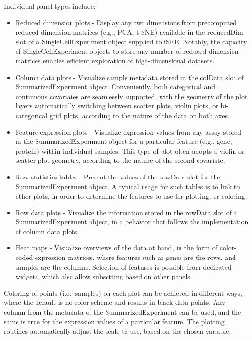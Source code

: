 \documentclass[10pt,a4paper,twocolumn]{article}
\begin{document}
Individual panel types include:

\begin{itemize}
\item Reduced dimension plots -  Display any two dimensions from precomputed reduced dimension matrices (e.g., PCA, t-SNE) available in the reducedDim slot of a SingleCellExperiment object supplied to iSEE. Notably, the capacity of SingleCellExperiment objects to store any number of reduced dimension matrices enables efficient exploration of high-dimensional datasets.
\item Column data plots - Visualize sample metadata stored in the colData slot of SummarizedExperiment object. Conveniently, both categorical and continuous covariates are seamlessly supported, with the geometry of the plot layers automatically switching between scatter plots, violin plots, or bi-categorical grid plots, according to the nature of the data on both axes.
\item Feature expression plots - Visualize expression values from any assay stored in the SummarizedExperiment object for a particular feature (e.g., gene, protein) within individual samples.
This type of plot often adopts a violin or scatter plot geometry, according to the nature of the second covariate.
\item Row statistics tables - Present the values of the rowData slot for the SummarizedExperiment object. A typical usage for such tables is to link to other plots, in order to determine the features to use for plotting, or coloring.
\item Row data plots - Visualize the information stored in the rowData slot of a SummarizedExperiment object, in a behavior that follows the implementation of column data plots.
\item Heat maps - Visualize overviews of the data at hand, in the form of color-coded expression matrices, where features such as genes are the rows, and samples are the columns. Selection of features is possible from dedicated widgets, which also allow subsetting based on other panels.
\end{itemize}

Coloring of points (i.e., samples) on each plot can be achieved in different ways, where the default is no color scheme and results in black data points.
Any column from the metadata of the SummarizedExperiment can be used, and the same is true for the expression values of a particular feature. The plotting routines automatically adjust the scale to use, based on the chosen variable.
\end{document}
